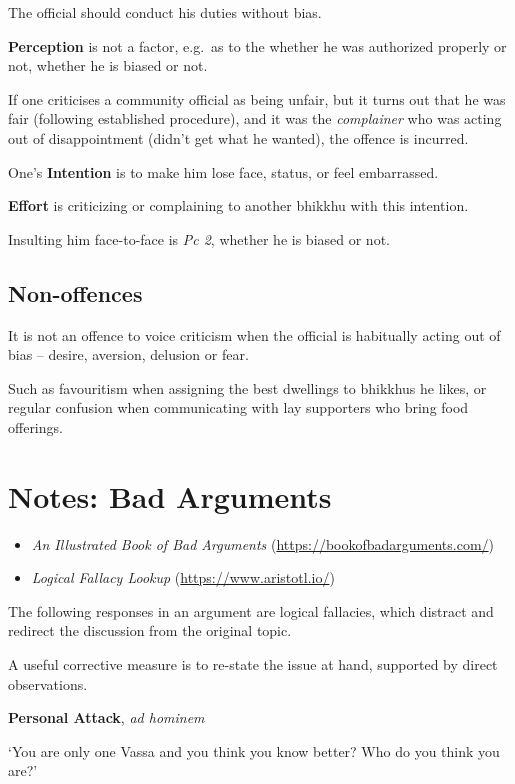 The official should conduct his duties without bias.

\textbf{Perception} is not a factor, e.g.~as to the whether he was
authorized properly or not, whether he is biased or not.

\clearpage

If one criticises a community official as being unfair, but it turns out
that he was fair (following established procedure), and it was the
\emph{complainer} who was acting out of disappointment (didn't get what
he wanted), the offence is incurred.

One's \textbf{Intention} is to make him lose face, status, or feel
embarrassed.

\textbf{Effort} is criticizing or complaining to another bhikkhu with
this intention.

Insulting him face-to-face is \emph{Pc 2}, whether he is biased or not.

\subsection{Non-offences}

It is not an offence to voice criticism when the official is habitually
acting out of bias -- desire, aversion, delusion or fear.

Such as favouritism when assigning the best dwellings to bhikkhus he
likes, or regular confusion when communicating with lay supporters who
bring food offerings.

\section{Notes: Bad Arguments}

\begin{itemize}
\tightlist
\item
  \emph{An Illustrated Book of Bad Arguments}
  (\url{https://bookofbadarguments.com/})
\item
  \emph{Logical Fallacy Lookup} (\url{https://www.aristotl.io/})
\end{itemize}

The following responses in an argument are logical fallacies, which
distract and redirect the discussion from the original topic.

A useful corrective measure is to re-state the issue at hand, supported
by direct observations.

\textbf{Personal Attack}, \emph{ad hominem}

`You are only one Vassa and you think you know better? Who do you think
you are?'

